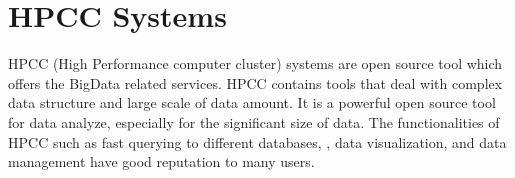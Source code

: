 \section{HPCC Systems}

HPCC (High Performance computer cluster) systems are open source tool which offers the BigData related services\cite{HPCC}. HPCC contains tools that deal with complex data structure and large scale of data amount. It is a powerful open source tool for data analyze, especially for the significant size of data. The functionalities of HPCC such as fast querying to different databases, , data visualization, and data management have good reputation to many users.
